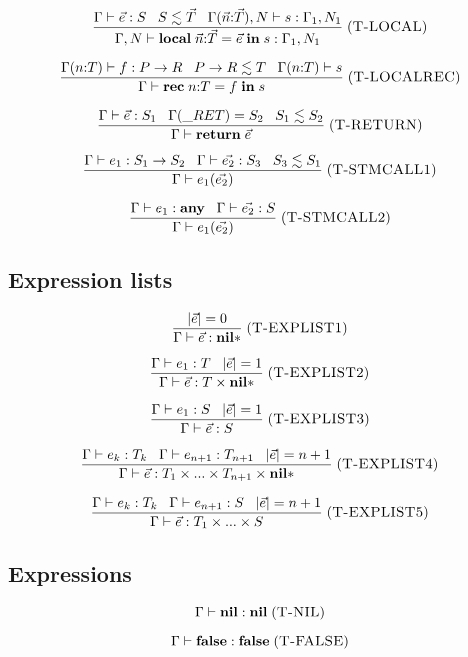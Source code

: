 \documentclass[12pt]{article}
\newcommand{\Any}{\mathbf{any}}
\newcommand{\Nil}{\mathbf{nil}}
\newcommand{\False}{\mathbf{false}}
\newcommand{\kw}[1]{\mathbf{#1}}
\newcommand{\mylabel}[1]{\; (\textsc{#1})}
\newcommand{\env}{\Gamma}
\newcommand{\ret}{\string_RET}
\begin{document}
\[
\frac{\env \vdash \vec{e}:S \;\;\; S \lesssim \vec{T} \;\;\;
      \env(\vec{n}{:}\vec{T}), N \vdash s : \env_{1}, N_{1}}
     {\env, N \vdash \kw{local} \; \vec{n}{:}\vec{T} = \vec{e} \; \kw{in} \; s : \env_{1}, N_{1}}
\mylabel{T-LOCAL}
\]

\[
\frac{\env(n{:}T) \vdash f:P \rightarrow R \;\;\; P \rightarrow R \lesssim T \;\;\;
      \env(n{:}T) \vdash s}
     {\env \vdash \kw{rec} \; n{:}T = f \; \kw{in} \; s}
\mylabel{T-LOCALREC}
\]

\[
\frac{\env \vdash \vec{e}:S_{1} \;\;\;
      \env(\ret) = S_{2} \;\;\;
      S_{1} \lesssim S_{2}}
     {\env \vdash \kw{return} \; \vec{e}}
\mylabel{T-RETURN}
\]

\[
\frac{\env \vdash e_{1}:S_{1} \rightarrow S_{2} \;\;\;
      \env \vdash \vec{e_{2}}:S_{3} \;\;\;
      S_{3} \lesssim S_{1}}
     {\env \vdash e_{1}(\vec{e_{2}})}
\mylabel{T-STMCALL1}
\]

\[
\frac{\env \vdash e_{1}:\Any \;\;\;
      \env \vdash \vec{e_{2}}:S}
     {\env \vdash e_{1}(\vec{e_{2}})}
\mylabel{T-STMCALL2}
\]

\subsection{Expression lists}

\[
\frac{|\vec{e}| = 0}
     {\env \vdash \vec{e} : \Nil{*}}
\mylabel{T-EXPLIST1}
\]

\[
\frac{\env \vdash e_{1}:T \;\;\;
      |\vec{e}| = 1}
     {\env \vdash \vec{e} : T \times \Nil{*}}
\mylabel{T-EXPLIST2}
\]

\[
\frac{\env \vdash e_{1}:S \;\;\;
      |\vec{e}| = 1}
     {\env \vdash \vec{e} : S}
\mylabel{T-EXPLIST3}
\]

\[
\frac{\env \vdash e_{k}:T_{k} \;\;\;
      \env \vdash e_{n+1}:T_{n+1} \;\;\;
      |\vec{e}| = n + 1}
     {\env \vdash \vec{e} : T_{1} \times ... \times T_{n+1} \times \Nil{*}}
\mylabel{T-EXPLIST4}
\]

\[
\frac{\env \vdash e_{k}:T_{k} \;\;\;
      \env \vdash e_{n+1}:S \;\;\;
      |\vec{e}| = n + 1}
     {\env \vdash \vec{e} : T_{1} \times ... \times S}
\mylabel{T-EXPLIST5}
\]

\subsection{Expressions}

\[
\env \vdash \kw{nil} : \Nil
\mylabel{T-NIL}
\]

\[
\env \vdash \kw{false} : \False
\mylabel{T-FALSE}
\]
\end{document}
